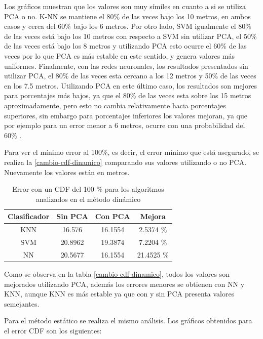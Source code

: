 Los gráficos muestran que los valores son muy símiles en cuanto a si se utiliza PCA o no. K-NN se mantiene el 80\% de las veces bajo los 10 metros, en ambos casos y cerca del 60\% bajo los 6 metros. Por otro lado, SVM igualmente el 80\% de las veces está bajo los 10 metros con respecto a SVM sin utilizar PCA, el 50\% de las veces está bajo los 8 metros y utilizando PCA esto ocurre el 60\% de las veces por lo que PCA es más estable en este sentido, y genera valores más uniformes. Finalmente, con las redes neuronales, los resultados presentados sin utilizar PCA, el 80\% de las veces esta cercano a los 12 metros y 50\% de las veces en los 7.5 metros. Utilizando PCA en este último caso, los resultados son mejores para porcentajes más bajos, ya que el 80\% de las veces esta sobre los 15 metros aproximadamente,  pero esto no cambia relativamente hacia porcentajes superiores, sin embargo para porcentajes inferiores los valores mejoran, ya que por ejemplo para un error menor a 6 metros, ocurre con una probabilidad del 60\% .

Para ver el mínimo error al 100\%, es decir, el error mínimo que está asegurado, se realiza la \autoref{cambio-cdf-dinamico} comparando sus valores utilizando o no PCA. Nuevamente los valores están en metros.

\newpage

\begin{table}[!h]
\centering
\caption[Error con un CDF del 100 \% para los algoritmos analizados  en el método dinámico]{Error con un CDF del 100 \% para los algoritmos analizados  en el método dinámico}
\label{cambio-cdf-dinamico}
\begin{tabular}{|c|c|c|c|}
\hline
Clasificador & Sin PCA & Con PCA & Mejora     \\ \hline
KNN          & 16.576  & 16.1554 & 2.5374 \%  \\ \hline
SVM          & 20.8962 & 19.3874 & 7.2204 \%  \\ \hline
NN           & 20.5677 & 16.1554 & 21.4525 \% \\ \hline
\end{tabular}
\end{table}


Como se observa en la tabla \autoref{cambio-cdf-dinamico}, todos los valores son mejorados utilizando PCA, además los errores menores se obtienen con NN y KNN, aunque KNN es más estable ya que con y sin PCA presenta valores semejantes.

Para el método estático se realiza el mismo análisis. Los gráficos obtenidos para el error CDF son los siguientes:


